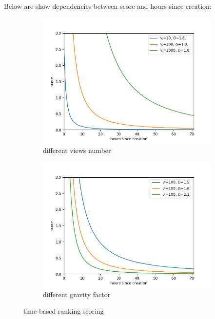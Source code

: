 \documentclass{article}
\begin{document}
Below are show dependencies between score and hours since creation:

\begin{figure}[h]
  \begin{subfigure}[b]{0.5\textwidth}
    \includegraphics[width=\textwidth]{images/time_ranking_1.png}
    \caption{different views number}
  \end{subfigure}
  \hfill
  \begin{subfigure}[b]{0.5\textwidth}
    \includegraphics[width=\textwidth]{images/time_ranking_2.png}
    \caption{different gravity factor}
  \end{subfigure}
\caption{time-based ranking scoring}
    \label{fig:samples}
\end{figure}
\end{document}
